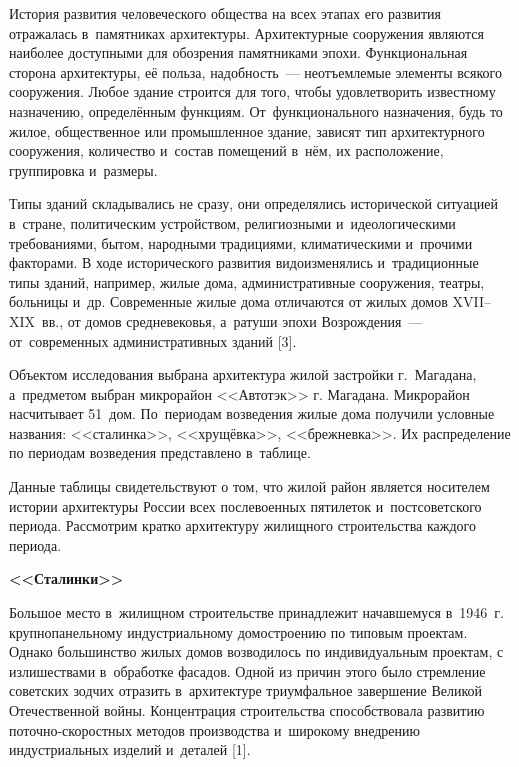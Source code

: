 



\makeProcTitle
{}

История развития человеческого общества на всех этапах его развития отражалась в~памятниках архитектуры. Архитектурные сооружения являются наиболее доступными для обозрения памятниками эпохи. Функциональная сторона архитектуры, её польза, надобность~--- неотъемлемые элементы всякого сооружения. Любое здание строится для того, чтобы удовлетворить известному назначению, определённым функциям. От~функционального назначения, будь то жилое, общественное или промышленное здание, зависят тип архитектурного сооружения, количество и~состав помещений в~нём, их расположение, группировка и~размеры.

Типы зданий складывались не сразу, они определялись исторической ситуацией в~стране, политическим устройством, религиозными и~идеологическими требованиями, бытом, народными традициями, климатическими и~прочими факторами. В ходе исторического развития видоизменялись и~традиционные типы зданий, например, жилые дома, административные сооружения, театры, больницы и~др. Современные жилые дома отличаются от жилых домов XVII--XIX~вв., от домов средневековья, а~ратуши эпохи Возрождения~--- от~современных административных зданий [3].

Объектом исследования выбрана архитектура жилой застройки г.~Магадана, а~предметом выбран микрорайон <<Автотэк>> г. Магадана. Микрорайон насчитывает 51~дом. По~периодам возведения жилые дома получили условные названия: <<сталинка>>, <<хрущёвка>>, <<брежневка>>. Их распределение по периодам возведения представлено в~таблице.



Данные таблицы свидетельствуют о том, что жилой район является носителем истории архитектуры России всех послевоенных пятилеток и~постсоветского периода. Рассмотрим кратко архитектуру жилищного строительства каждого периода.

\textbf{<<Сталинки>>}

Большое место в~жилищном строительстве принадлежит начавшемуся в~1946~г. крупнопанельному индустриальному домостроению по типовым проектам. Однако большинство жилых домов возводилось по индивидуальным проектам, с излишествами в~обработке фасадов. Одной из причин этого было стремление советских зодчих отразить в~архитектуре триумфальное завершение Великой Отечественной войны. Концентрация строительства способствовала развитию поточно-скоростных методов производства и~широкому внедрению индустриальных изделий и~деталей [1].

